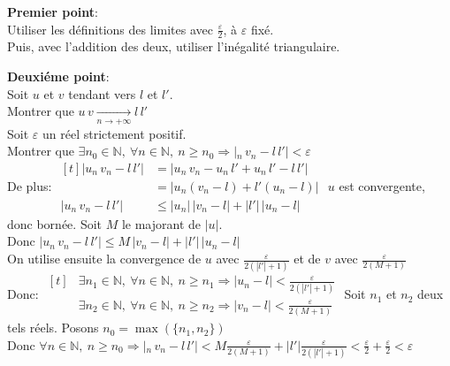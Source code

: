 \documentclass[12pt,twoside,a4paper]{article}
\begin{document}
		\begin{preuve}
			\begin{liste}
				\item\textbf{Premier point}:\\
					Utiliser les d\'efinitions des limites avec $\frac{\varepsilon}{2}$, \`a $\varepsilon$ fix\'e.\\
					Puis, avec l'addition des deux, utiliser l'in\'egalit\'e triangulaire.
				\item\textbf{Deuxi\'eme point}:\\
					Soit $u$ et $v$ tendant vers $l$ et $l'$.\\
					Montrer que $u\,v\mathop{\longrightarrow}\limits_{n\rightarrow+\infty}l\,l'$\\
					Soit $\varepsilon$ un r\'eel strictement positif.\\
					Montrer que $\exists n_0\in\mathbb{N},\ \forall n\in\mathbb{N},\ n\geqslant n_0\Rightarrow|_n\,v_n-l\,l'|<\varepsilon$\\
					De plus: $\begin{aligned}[t]
						|u_n\,v_n-l\,l'|&=|u_n\,v_n-u_n\,l'+u_n\,l'-l\,l'|\\
						                &=|u_n(v_n-l)+l'(u_n-l)|\\
						|u_n\,v_n-l\,l'|&\leqslant|u_n|\,|v_n-l|+|l'|\,|u_n-l|
					\end{aligned}$
					$u$ est convergente, donc born\'ee. Soit $M$ le majorant de $|u|$.\\
					Donc $|u_n\,v_n-l\,l'|\leqslant M\,|v_n-l|+|l'|\,|u_n-l|$\\
					On utilise ensuite la convergence de $u$ avec $\frac{\varepsilon}{2(|l'|+1)}$ et de $v$ avec $\frac{\varepsilon}{2(M+1)}$\\
					Donc: 
					$\begin{aligned}[t]
						&\exists n_1\in\mathbb{N},\ \forall n\in\mathbb{N},\ n\geqslant n_1\Rightarrow|u_n-l|<\frac{\varepsilon}{2(|l'|+1)}\\
						&\exists n_2\in\mathbb{N},\ \forall n\in\mathbb{N},\ n\geqslant n_2\Rightarrow|v_n-l|<\frac{\varepsilon}{2(M+1)}
					\end{aligned}$
					Soit $n_1$ et $n_2$ deux tels r\'eels. Posons $n_0=\max(\{n_1,n_2\})$\\
					Donc $\forall n\in\mathbb{N},\ n\geqslant n_0\Rightarrow|_n\,v_n-l\,l'|<M\frac{\varepsilon}{2(M+1)}+|l'|\frac{\varepsilon}{2(|l'|+1)}<\frac{\varepsilon}{2}+\frac{\varepsilon}{2}<\varepsilon$\\\\

\end{liste}
\end{preuve}
\end{document}
